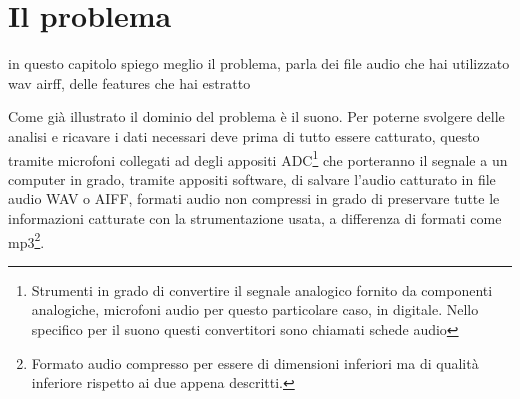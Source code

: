 \chapter{Il problema}
in questo capitolo spiego meglio il problema, parla dei file audio che hai utilizzato wav  airff, delle features che hai estratto 

Come già illustrato il dominio del problema è il suono. Per poterne svolgere delle analisi e ricavare i dati necessari deve prima di tutto essere catturato, questo tramite microfoni collegati ad degli appositi ADC\footnote{Strumenti in grado di convertire il segnale analogico fornito da componenti analogiche, microfoni audio per questo particolare caso, in digitale. Nello specifico per il suono questi convertitori sono chiamati schede audio} che porteranno il segnale a un computer in grado, tramite appositi software, di salvare l'audio catturato in file audio WAV o AIFF, formati audio non compressi in grado di preservare tutte le informazioni catturate con la strumentazione usata, a differenza di formati come mp3\footnote{Formato audio compresso per essere di dimensioni inferiori ma di qualità inferiore rispetto ai due appena descritti.}.

